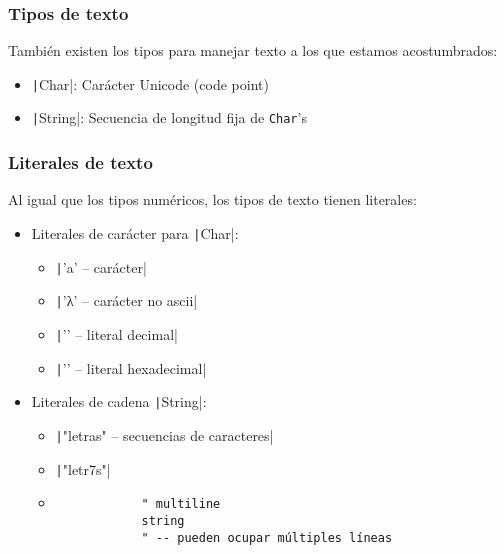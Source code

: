 \documentclass{beamer}
\begin{document}
\begin{frame}
  \frametitle{Tipos de texto}

  También existen los tipos para manejar texto a los que estamos acostumbrados:

  \begin{itemize}
    \item \texttt|Char|: Carácter Unicode (code point)
    \item \texttt|String|: Secuencia de longitud fija de
      \texttt{Char}'s
  \end{itemize}

\end{frame}

\begin{frame}[fragile]
  \frametitle{Literales de texto}

  Al igual que los tipos numéricos, los tipos de texto tienen literales:

  \begin{itemize}
    \item Literales de carácter para
      \texttt|Char|:
      \begin{itemize}
        \item \texttt|'a'    -- carácter|
        \item \texttt|'λ'    -- carácter no ascii|
        \item \texttt|''  -- literal decimal|
        \item \texttt|'' -- literal hexadecimal|
      \end{itemize}
    \item Literales de cadena
      \texttt|String|:
      \begin{itemize}
        \item \texttt|"letras" -- secuencias de caracteres|
        \item \texttt|"letr\97s"|
        \item
          \begin{verbatim}
            " multiline
            string
            " -- pueden ocupar múltiples líneas
          \end{verbatim}
      \end{itemize}
  \end{itemize}
\end{frame}
\end{document}
